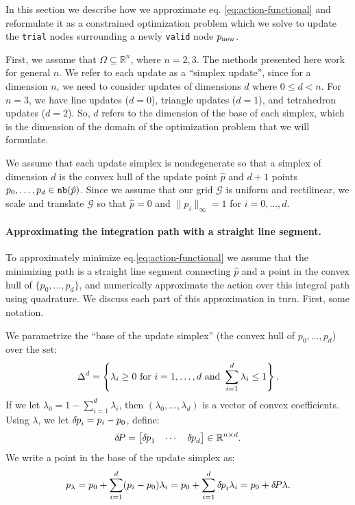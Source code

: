 \documentclass[smallcondensed]{svjour3}
\begin{document}
In this section we describe how we approximate eq.\@
\ref{eq:action-functional} and reformulate it as a constrained
optimization problem which we solve to update the \texttt{trial} nodes
surrounding a newly \texttt{valid} node $p_{\operatorname{new}}$.

First, we assume that $\Omega \subseteq \mathbb{R}^n$, where
$n = 2, 3$. The methods presented here work for general $n$. We refer
to each update as a ``simplex update'', since for a dimension $n$, we
need to consider updates of dimensions $d$ where $0 \leq d < n$. For
$n = 3$, we have line updates ($d = 0$), triangle updates ($d = 1$),
and tetrahedron updates ($d = 2$). So, $d$ refers to the dimension of
the base of each simplex, which is the dimension of the domain of the
optimization problem that we will formulate.

We assume that each update simplex is nondegenerate so that a simplex
of dimension $d$ is the convex hull of the update point $\hat{p}$ and
$d+1$ points $p_0, \hdots, p_{d} \in \texttt{nb}(\hat{p})$. Since we assume
that our grid $\mathcal{G}$ is uniform and rectilinear, we scale and
translate $\mathcal{G}$ so that $\hat{p} = 0$ and $\|p_i\|_\infty = 1$
for $i = 0, \hdots, d$.

\paragraph{Approximating the integration path with a straight line
  segment.} To approximately minimize eq.\@ \ref{eq:action-functional}
we assume that the minimizing path is a straight line segment
connecting $\hat{p}$ and a point in the convex hull of
$\{p_0, \hdots, p_d\}$, and numerically approximate the action over
this integral path using quadrature. We discuss each part of this
approximation in turn. First, some notation.

We parametrize the ``base of the update simplex'' (the convex hull of
$p_0, \hdots, p_d$) over the set:
\begin{equation}
  \label{eq:lambda}
  \Delta^d = \left\{\lambda_i \geq 0 \mbox{ for } i = 1, \hdots, d \mbox{ and } \sum_{i=1}^d \lambda_i \leq 1\right\}.
\end{equation}
If we let $\lambda_0 = 1 - \sum_{i=1}^d \lambda_i$, then
$(\lambda_0, \hdots, \lambda_d)$ is a vector of convex coefficients.
Using $\lambda$, we let ${\delta \hspace{-0.08em} p}_i = p_i - p_0$, define:
\begin{equation}
  {\delta \hspace{-0.14em} P} = \begin{bmatrix}
    {\delta \hspace{-0.08em} p}_1 & \cdots & {\delta \hspace{-0.08em} p}_d
  \end{bmatrix} \in \mathbb{R}^{n \times d}.
\end{equation}
We write a point in the base of the update simplex as:
\begin{equation}
  p_\lambda = p_0 + \sum_{i=1}^d (p_i - p_0) \lambda_i = p_0 + \sum_{i=1}^d {\delta \hspace{-0.08em} p}_i \lambda_i = p_0 + {\delta \hspace{-0.14em} P} \lambda.
\end{equation}
\end{document}
